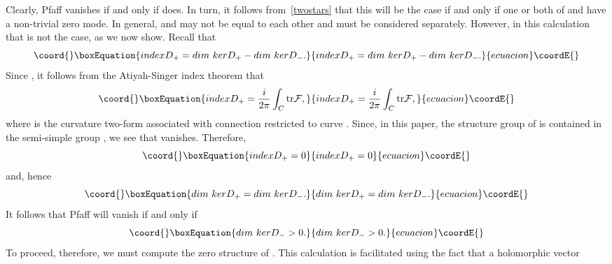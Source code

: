 \documentclass[a4paper,12pt]{article}
\numberwithin{equation}{section}
\theoremstyle{plain}
\begin{document}
Clearly, Pfaff\coordHE{} vanishes if and only if \coordHE{}
does. In turn, it follows from~\eqref{twostars} that this will be the case
if and only if one or both of \coordHE{} and \coordHE{} have a non-trivial zero
mode.
In general, \coordHE{} and  \coordHE{} may not be equal to
each
other and must be considered separately. However, in this calculation that
is
not the case, as we now show. Recall that
%
\begin{equation}\coord{}\boxEquation{
index D_{+} = dim {\ } ker D_{+} - dim {\ } ker D_{-}.
\label{15}
}{
index D_{+} = dim {\ } ker D_{+} - dim {\ } ker D_{-}.
}{ecuacion}\coordE{}\end{equation}
%
Since \coordHE{}, it follows from the Atiyah-Singer index
theorem that
%
\begin{equation}\coord{}\boxEquation{
index D_{+} = \frac{i}{2\pi} \int_{ C}{{\rm tr} {\cal{F}}},
\label{16}
}{
index D_{+} = \frac{i}{2\pi} \int_{ C}{{\rm tr} {\cal{F}}},
}{ecuacion}\coordE{}\end{equation}
%
where \coordHE{} is the curvature two-form associated with connection
\coordHE{}
restricted to curve \coordHE{}. Since, in this paper, the structure group of \coordHE{}
is contained in the semi-simple group \coordHE{},
we see that \coordHE{} vanishes.
Therefore,
%
\begin{equation}\coord{}\boxEquation{
index D_{+} =0
\label{17}
}{
index D_{+} =0
}{ecuacion}\coordE{}\end{equation}
%
and, hence
%
\begin{equation}\coord{}\boxEquation{
dim{\ } ker D_{+} = dim{\ } ker D_{-}.
\label{18}
}{
dim{\ } ker D_{+} = dim{\ } ker D_{-}.
}{ecuacion}\coordE{}\end{equation}
%
It follows that Pfaff\coordHE{} will vanish if and only if
%
\begin{equation}\coord{}\boxEquation{
dim{\ } ker D_{-} >0 .
\label{threelines}
}{
dim{\ } ker D_{-} >0 .
}{ecuacion}\coordE{}\end{equation}
%
To proceed, therefore, we must compute the zero structure of \coordHE{}.
This calculation is facilitated using the fact that a holomorphic vector
\end{document}

